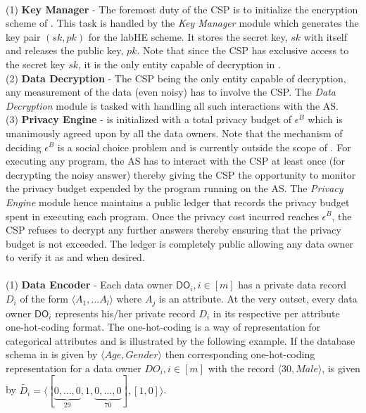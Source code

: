 \\
(1)\textbf{ Key Manager }- The foremost duty of the \textsf{CSP} is to initialize the encryption scheme of \system. This task is handled by the \textit{Key Manager} module which generates the key pair $(sk,pk)$ for the \textsf{labHE} scheme. It stores the secret key, $sk$ with itself and releases the public key, $pk$. Note that since the \textsf{CSP} has exclusive access to the secret key $sk$, it is the only entity capable of decryption in \system.\\
(2)\textbf{ Data Decryption }- The \textsf{CSP} being the only entity capable of decryption,  any measurement of the data (even noisy) has to involve the \textsf{CSP}. The \textit{Data Decryption} module is tasked with handling all such interactions with the \textsf{AS}. \\
(3)\textbf{ Privacy Engine }- \system is initialized with a total privacy budget of $\epsilon^B$ which is unanimously agreed upon by all the data owners. Note that the mechanism of deciding $\epsilon^B$ is a social choice problem \cite{Abowd18Economic,e1,e2} and is currently outside the scope of \system. For executing any program, the \textsf{AS} has to interact with the \textsf{CSP} at least once (for decrypting the noisy answer) thereby giving the \textsf{CSP} the opportunity to monitor the privacy budget expended by the program running on the \textsf{AS}. The \textit{Privacy Engine} module hence maintains a public ledger that records the privacy budget spent in executing each program. Once the privacy cost incurred reaches 
$\epsilon^B$, the \textsf{CSP} refuses to decrypt any further answers thereby ensuring that the privacy budget is not exceeded.  The ledger is completely public allowing any data owner to verify it as and when desired.\\
\\
(1)\textbf{ Data Encoder} -  Each data owner $\textsf{DO}_i, i \in [m]$ has a private data record $D_i$ of the form $\langle A_1,...A_l\rangle$ where ${A}_j$ is an attribute. At the very outset, every data owner  $\textsf{DO}_i$ represents his/her private record $D_i$ in its respective per attribute one-hot-coding format. The one-hot-coding is a way of representation for categorical attributes and is illustrated by the following example. 
If the database schema in \system is given by  $\langle Age,Gender\rangle$ then corresponding one-hot-coding representation for a data owner $DO_i, i \in [m]$ with the record $\langle 30, Male\rangle$, is given by $\tilde{D_i}=\langle[\underbrace{0,\ldots,0}_{29},1,\underbrace{0,\ldots,0}_{70}],[1,0]\rangle$. \\
